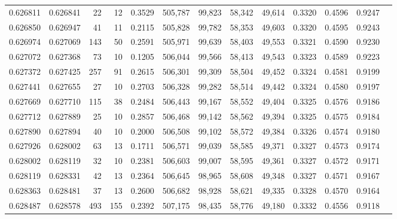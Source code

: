\begin{tabular}{rrrrrrrrrrrrr}
0.626811 & 0.626841 &    22 &  12 &                                     0.3529 & 505,787 &  99,823 &  58,342 &  49,614 & 0.3320 & 0.4596 & 0.9247 \\
0.626850 & 0.626947 &    41 &  11 &                                     0.2115 & 505,828 &  99,782 &  58,353 &  49,603 & 0.3320 & 0.4595 & 0.9243 \\
0.626974 & 0.627069 &   143 &  50 &                                     0.2591 & 505,971 &  99,639 &  58,403 &  49,553 & 0.3321 & 0.4590 & 0.9230 \\
0.627072 & 0.627368 &    73 &  10 &                                     0.1205 & 506,044 &  99,566 &  58,413 &  49,543 & 0.3323 & 0.4589 & 0.9223 \\
0.627372 & 0.627425 &   257 &  91 &                                     0.2615 & 506,301 &  99,309 &  58,504 &  49,452 & 0.3324 & 0.4581 & 0.9199 \\
0.627441 & 0.627655 &    27 &  10 &                                     0.2703 & 506,328 &  99,282 &  58,514 &  49,442 & 0.3324 & 0.4580 & 0.9197 \\
0.627669 & 0.627710 &   115 &  38 &                                     0.2484 & 506,443 &  99,167 &  58,552 &  49,404 & 0.3325 & 0.4576 & 0.9186 \\
0.627712 & 0.627889 &    25 &  10 &                                     0.2857 & 506,468 &  99,142 &  58,562 &  49,394 & 0.3325 & 0.4575 & 0.9184 \\
0.627890 & 0.627894 &    40 &  10 &                                     0.2000 & 506,508 &  99,102 &  58,572 &  49,384 & 0.3326 & 0.4574 & 0.9180 \\
0.627926 & 0.628002 &    63 &  13 &                                     0.1711 & 506,571 &  99,039 &  58,585 &  49,371 & 0.3327 & 0.4573 & 0.9174 \\
0.628002 & 0.628119 &    32 &  10 &                                     0.2381 & 506,603 &  99,007 &  58,595 &  49,361 & 0.3327 & 0.4572 & 0.9171 \\
0.628119 & 0.628331 &    42 &  13 &                                     0.2364 & 506,645 &  98,965 &  58,608 &  49,348 & 0.3327 & 0.4571 & 0.9167 \\
0.628363 & 0.628481 &    37 &  13 &                                     0.2600 & 506,682 &  98,928 &  58,621 &  49,335 & 0.3328 & 0.4570 & 0.9164 \\
0.628487 & 0.628578 &   493 & 155 &                                     0.2392 & 507,175 &  98,435 &  58,776 &  49,180 & 0.3332 & 0.4556 & 0.9118 \\

\end{tabular}
